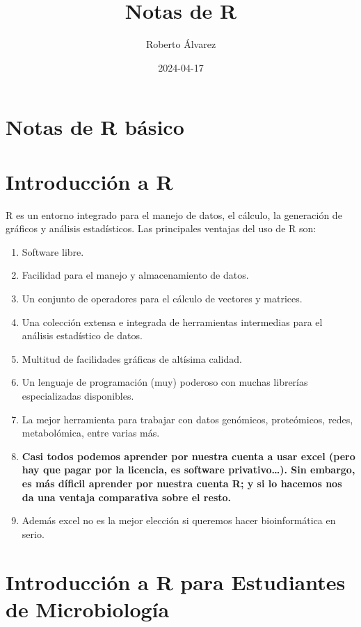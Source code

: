 \documentclass[
]{book}
\title{Notas de R}
\author{Roberto Álvarez}
\date{2024-04-17}
\providecommand{\tightlist}{%
  \setlength{\itemsep}{0pt}\setlength{\parskip}{0pt}}
\begin{document}
\maketitle

{
\setcounter{tocdepth}{1}
\tableofcontents
}
\hypertarget{notas-de-r-buxe1sico}{%
\chapter{Notas de R básico}\label{notas-de-r-buxe1sico}}

\hypertarget{intro}{%
\chapter{Introducción a R}\label{intro}}

R es un entorno integrado para el manejo de datos, el cálculo, la generación de gráficos y análisis estadísticos. Las principales ventajas del uso de R son:

\begin{enumerate}
\def\labelenumi{\arabic{enumi}.}
\tightlist
\item
  Software libre.
\item
  Facilidad para el manejo y almacenamiento de datos.
\item
  Un conjunto de operadores para el cálculo de vectores y matrices.
\item
  Una colección extensa e integrada de herramientas intermedias para el análisis estadístico de datos.
\item
  Multitud de facilidades gráficas de altísima calidad.
\item
  Un lenguaje de programación (muy) poderoso con muchas librerías especializadas disponibles.
\item
  La mejor herramienta para trabajar con datos genómicos, proteómicos, redes, metabolómica, entre varias más.
\item
  \textbf{Casi todos podemos aprender por nuestra cuenta a usar excel (pero hay que pagar por la licencia, es software privativo\ldots). Sin embargo, es más díficil aprender por nuestra cuenta R; y si lo hacemos nos da una ventaja comparativa sobre el resto.}
\item
  Además excel no es la mejor elección si queremos hacer bioinformática en serio.
\end{enumerate}

\hypertarget{introducciuxf3n-a-r-para-estudiantes-de-microbiologuxeda}{%
\chapter{Introducción a R para Estudiantes de Microbiología}\label{introducciuxf3n-a-r-para-estudiantes-de-microbiologuxeda}}
\end{document}
